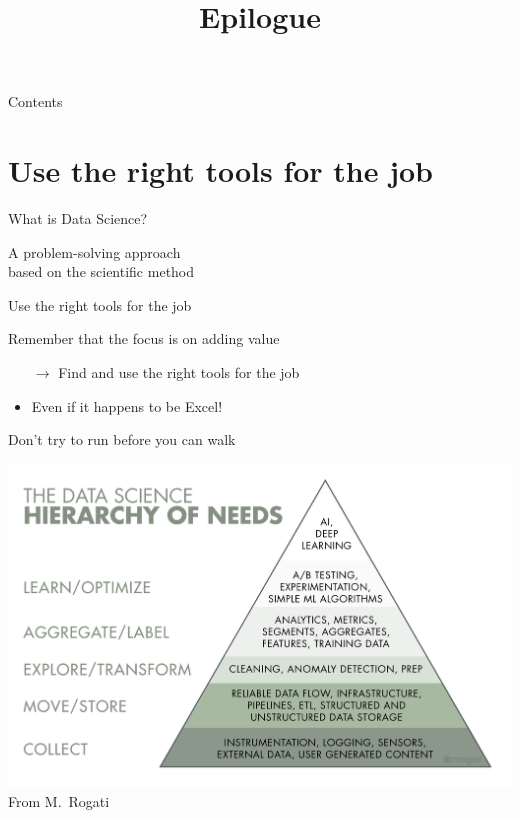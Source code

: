

\title{Epilogue}



\maketitle

\begin{frame}{Contents}
    \tableofcontents[hideallsubsections]
\end{frame}

\section{Use the right tools for the job}

\begin{frame}{What is Data Science?}
    \begin{center}
        \LARGE%
        A \alert{problem\hyp{}solving approach} \\
        based on the scientific method
    \end{center}
\end{frame}

\begin{frame}{Use the right tools for the job}
    \begin{center}
        \Large%
        Remember that the focus is on \alert{adding value}
    \end{center}
    \vfill
    \begin{itemize}
        \item[$\rightarrow$] Find and use the right tools for the job
        \item Even if it happens to be Excel!
    \end{itemize}
\end{frame}

\begin{frame}{Don't try to run before you can walk}
    \begin{center}
        \includegraphics[height=0.8\textheight]{figures/ai_hierarchy} \\
        {\scriptsize%
         From M.\ Rogati}
    \end{center}
\end{frame}

